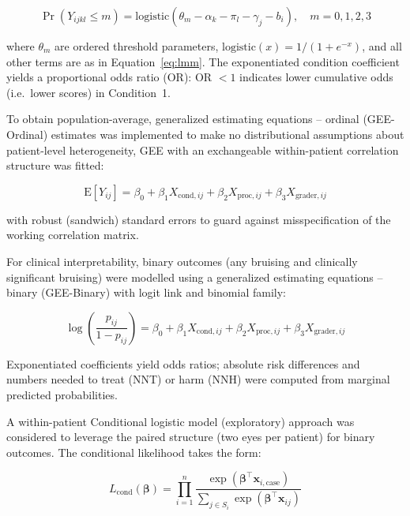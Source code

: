 \begin{equation}
\Pr(Y_{ijkl} \leq m) = \text{logistic}\!\left(\theta_m - \alpha_k - \pi_l - \gamma_j - b_i\right), \quad m = 0,1,2,3
\label{eq:clmm}
\end{equation}

\noindent where $\theta_m$ are ordered threshold parameters, $\text{logistic}(x) = 1/(1+e^{-x})$, and all other terms are as in Equation~\ref{eq:lmm}. The exponentiated condition coefficient yields a proportional odds ratio (OR): OR $< 1$ indicates lower cumulative odds (i.e.\ lower scores) in Condition~1. 


To obtain population-average, generalized estimating equations -- ordinal (GEE-Ordinal) estimates was implemented to make no distributional assumptions about patient-level heterogeneity, GEE with an exchangeable within-patient correlation structure was fitted:

\begin{equation}
\mathrm{E}[Y_{ij}] = \beta_0 + \beta_1 X_{\text{cond},ij} + \beta_2 X_{\text{proc},ij} + \beta_3 X_{\text{grader},ij}
\label{eq:gee}
\end{equation}

\noindent with robust (sandwich) standard errors to guard against misspecification of the working correlation matrix.


For clinical interpretability, binary outcomes (any bruising and clinically significant bruising) were modelled using a generalized estimating equations -- binary (GEE-Binary) with logit link and binomial family:

\begin{equation}
\log\!\left(\frac{p_{ij}}{1-p_{ij}}\right) = \beta_0 + \beta_1 X_{\text{cond},ij} + \beta_2 X_{\text{proc},ij} + \beta_3 X_{\text{grader},ij}
\label{eq:gee-bin}
\end{equation}

\noindent Exponentiated coefficients yield odds ratios; absolute risk differences and numbers needed to treat (NNT) or harm (NNH) were computed from marginal predicted probabilities.

A within-patient Conditional logistic model (exploratory) approach was considered to leverage the paired structure (two eyes per patient) for binary outcomes. The conditional likelihood takes the form:

\begin{equation}
L_{\text{cond}}(\boldsymbol{\beta}) = \prod_{i=1}^{n} \frac{\exp(\boldsymbol{\beta}^\top \mathbf{x}_{i,\text{case}})}{\sum_{j \in S_i} \exp(\boldsymbol{\beta}^\top \mathbf{x}_{ij})}
\label{eq:clogit}
\end{equation}

